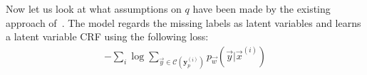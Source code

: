 %
%



Now let us look at what assumptions on $q$ have been made by the existing approach of~\cite{bellare2007learning}.
The model regards the missing labels as latent variables and learns a latent variable CRF using the following loss:
\begin{align}
-\sum_{i}
\log
\sum_{ \vec{y}\in\mathcal{C}(\mathbf{y}^{(i)}_p) } 
p_{\vec{w}} (\vec{y} \vert \vec{x}^{(i)}) 
\end{align}

